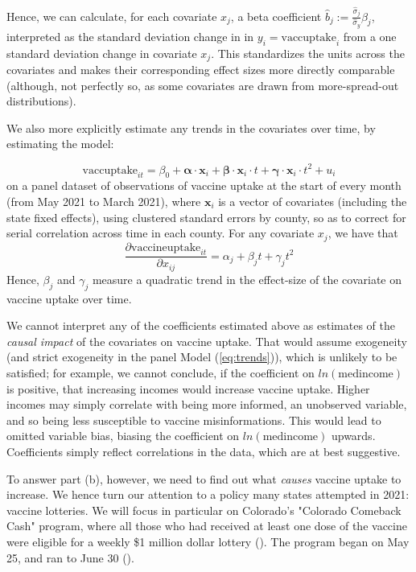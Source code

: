 \documentclass[12pt]{article}
\begin{document}
\begin{spacing}{1.5}
		Hence, we can calculate, for each covariate $x_j$, a beta coefficient $\hat{b}_j := \frac{\hat{\sigma}_j}{\hat{\sigma}_y}\beta_j$, interpreted as the standard deviation change in in $y_i=\textrm{vaccuptake}_i$ from a one standard deviation change in covariate $x_j$. This standardizes the units across the covariates and makes their corresponding effect sizes more directly comparable (although, not perfectly so, as some covariates are drawn from more-spread-out distributions).
		
		We also more explicitly estimate any trends in the covariates over time, by estimating the model:
		
		\begin{equation}
			\textrm{vaccuptake}_{it} =  \beta_0 + \boldsymbol{\alpha}\cdot\mathbf{x}_{i} + \boldsymbol{\beta}\cdot\mathbf{x}_{i}\cdot t + \boldsymbol{\gamma}\cdot\mathbf{x}_{i}\cdot t^2 + u_i
		\end{equation}
		on a panel dataset of observations of vaccine uptake at the start of every month (from May 2021 to March 2021), where $\mathbf{x}_{i}$ is a vector of covariates (including the state fixed effects), using clustered standard errors by county, so as to correct for serial correlation across time in each county. For any covariate $x_j$, we have that
		\begin{equation} \label{eq:trends}
			\frac{\partial \textrm{vaccineuptake}_{it}}{\partial x_{ij}} = \alpha_j + \beta_jt + \gamma_jt^2
		\end{equation}
		Hence, $\beta_j$ and $\gamma_j$ measure a quadratic trend in the effect-size of the covariate on vaccine uptake over time.
		
		
		We cannot interpret any of the coefficients estimated above as estimates of the \textit{causal impact} of the covariates on vaccine uptake. That would assume exogeneity (and strict exogeneity in the panel Model (\ref{eq:trends})), which is unlikely to be satisfied; for example, we cannot conclude, if the coefficient on $ln(\textrm{medincome})$ is positive, that increasing incomes would increase vaccine uptake. Higher incomes may simply correlate with being more informed, an unobserved variable, and so being less susceptible to vaccine misinformations. This would lead to omitted variable bias, biasing the coefficient on $ln(\textrm{medincome})$ upwards. Coefficients simply reflect correlations in the data, which are at best suggestive.
		
		To answer part (b), however, we need to find out what \textit{causes} vaccine uptake to increase. We hence turn our attention to a policy many states attempted in 2021: vaccine lotteries. We will focus in particular on Colorado's "Colorado Comeback Cash" program, where all those who had received at least one dose of the vaccine were eligible for a weekly \$1 million dollar lottery (\cite{murphy_colorado_2021}). The program began on May 25, and ran to June 30 (\cite{thirumurthy_association_2022}).
		

\end{spacing}
\end{document}
